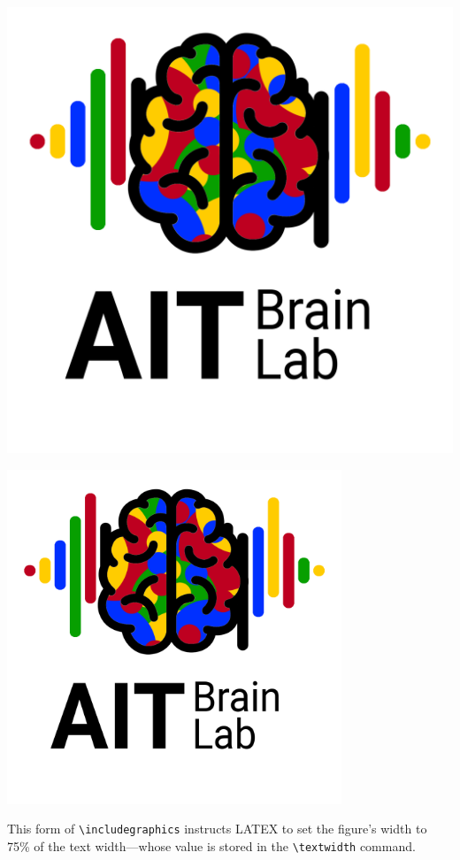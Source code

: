 \documentclass{article}
\begin{document}
\includegraphics{figures/bci-logo.png}

\newpage
\includegraphics[width=0.75\textwidth]{figures/bci-logo.png}

This form of \verb!\includegraphics! instructs LATEX to set the figure's width to 75\% 
of the text width—whose value is stored in the \verb!\textwidth! command.
\end{document}
